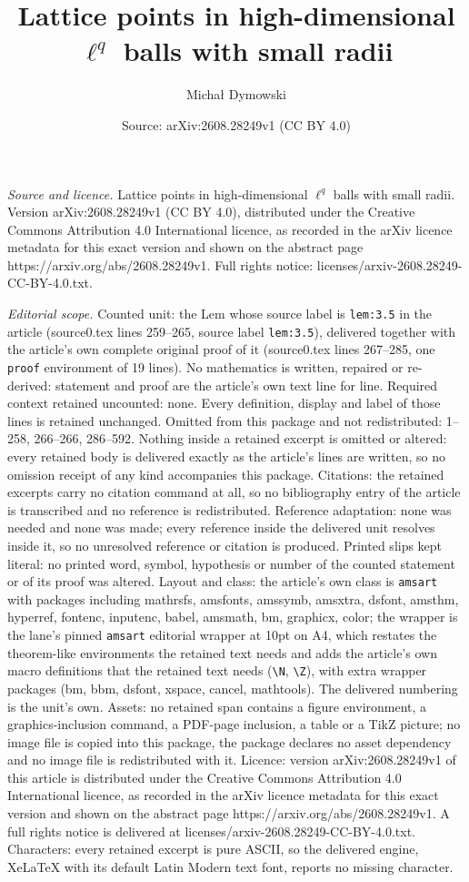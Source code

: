 \documentclass[10pt,a4paper]{amsart}
\title[Lattice points in high-dimensional $\ell^q$ balls with small]{Lattice points in high-dimensional $\ell^q$ balls with small radii}
\author{Micha{\l} Dymowski}
\date{Source: arXiv:2608.28249v1 (CC BY 4.0)}
\begin{document}
\maketitle

\noindent\emph{Source and licence.} Lattice points in high-dimensional $\ell^q$ balls with small radii. Version arXiv:2608.28249v1 (CC BY 4.0), distributed under the Creative Commons Attribution 4.0 International licence, as recorded in the arXiv licence metadata for this exact version and shown on the abstract page https://arxiv.org/abs/2608.28249v1. Full rights notice: licenses/arxiv-2608.28249-CC-BY-4.0.txt.\par\smallskip

\noindent\textit{Editorial scope.} Counted unit: the Lem whose source label is \texttt{lem:3.5} in the article (source0.tex lines 259--265, source label \texttt{lem:3.5}), delivered together with the article's own complete original proof of it (source0.tex lines 267--285, one \texttt{proof} environment of 19 lines). No mathematics is written, repaired or re-derived: statement and proof are the article's own text line for line. Required context retained uncounted: none. Every definition, display and label of those lines is retained unchanged. Omitted from this package and not redistributed: 1--258, 266--266, 286--592. Nothing inside a retained excerpt is omitted or altered: every retained body is delivered exactly as the article's lines are written, so no omission receipt of any kind accompanies this package. Citations: the retained excerpts carry no citation command at all, so no bibliography entry of the article is transcribed and no reference is redistributed. Reference adaptation: none was needed and none was made; every reference inside the delivered unit resolves inside it, so no unresolved reference or citation is produced. Printed slips kept literal: no printed word, symbol, hypothesis or number of the counted statement or of its proof was altered. Layout and class: the article's own class is \texttt{amsart} with packages including mathrsfs, amsfonts, amssymb, amsxtra, dsfont, amsthm, hyperref, fontenc, inputenc, babel, amsmath, bm, graphicx, color; the wrapper is the lane's pinned \texttt{amsart} editorial wrapper at 10pt on A4, which restates the theorem-like environments the retained text needs and adds the article's own macro definitions that the retained text needs (\texttt{\textbackslash N}, \texttt{\textbackslash Z}), with extra wrapper packages (bm, bbm, dsfont, xspace, cancel, mathtools). The delivered numbering is the unit's own. Assets: no retained span contains a figure environment, a graphics-inclusion command, a PDF-page inclusion, a table or a TikZ picture; no image file is copied into this package, the package declares no asset dependency and no image file is redistributed with it. Licence: version arXiv:2608.28249v1 of this article is distributed under the Creative Commons Attribution 4.0 International licence, as recorded in the arXiv licence metadata for this exact version and shown on the abstract page https://arxiv.org/abs/2608.28249v1. A full rights notice is delivered at licenses/arxiv-2608.28249-CC-BY-4.0.txt. Characters: every retained excerpt is pure ASCII, so the delivered engine, XeLaTeX with its default Latin Modern text font, reports no missing character.
\end{document}
